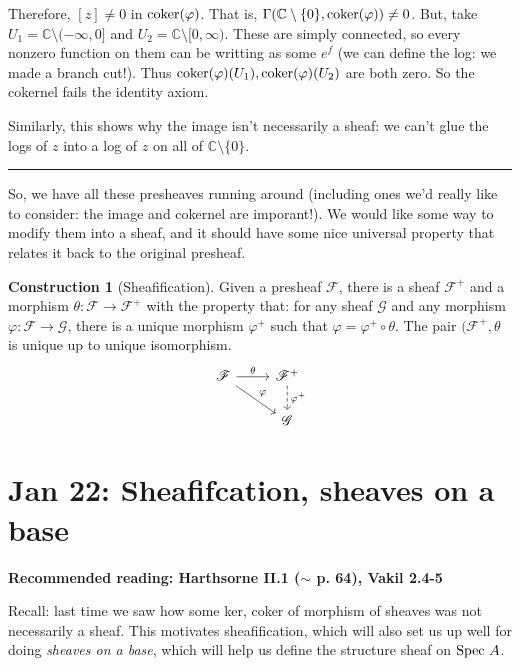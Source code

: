 \documentclass[10pt,reqno]{amsart}
\theoremstyle{definition}
\newtheorem{construction}[theorem]{Construction}
\theoremstyle{remark}
\numberwithin{equation}{section}
\numberwithin{theorem}{section}
\newcommand{\C}{{\mathbb C}}
\newcommand{\spec}{\textup{Spec }}
\newcommand{\coker}{\textup{coker}}
\newcommand{\FF}{{\mathscr F}}
\newcommand{\GG}{{\mathscr G}}
\begin{document}
Therefore, $[z] \ne 0$ in $\textup{coker}(\varphi)$. That is, $\Gamma(\C \setminus \{0\}, \textup{coker}(\varphi)) \ne 0$. But, take $U_1 = \C \setminus (-\infty,0]$ and $U_2 = \C \setminus [0, \infty)$. These are simply connected, so every nonzero function on them can be writting as some $e^f$ (we can define the log: we made a branch cut!). Thus $\coker(\varphi)(U_1), \coker(\varphi)(U_2)$ are both zero. So the cokernel fails the identity axiom.

Similarly, this shows why the image isn't necessarily a sheaf: we can't glue the logs of $z$ into a log of $z$ on all of $\C \setminus\{0\}$.
\\

\hrule
\vspace{1em}

So, we have all these presheaves running around (including ones we'd really like to consider: the image and cokernel are imporant!). We would like some way to modify them into a sheaf, and it should have some nice universal property that relates it back to the original presheaf.

\begin{construction}[Sheafification] Given a presheaf $\FF$, there is a sheaf $\FF^{+}$ and a morphism $\theta: \FF \to \FF^+$ with the property that: for any sheaf $\GG$ and any morphism $\varphi: \FF \to \GG$, there is a unique morphism $\varphi^+$ such that $\varphi = \varphi^+ \circ \theta$. The pair $(\FF^+, \theta$ is unique up to unique isomorphism.
\[\begin{tikzcd}
\FF \arrow[dr, "\varphi"] \arrow[r, "\theta"]& \FF^+ \arrow[d, dashed,"\varphi^+"]\\
& \GG
\end{tikzcd}\]
\end{construction}
\section{Jan 22: Sheafifcation, sheaves on a base}
\textbf{Recommended reading: Harthsorne II.1 ($\sim$ p. 64), Vakil 2.4-5}

Recall: last time we saw how some ker, coker of morphism of sheaves was not necessarily a sheaf. This motivates sheafification, which will also set us up well for doing \textit{sheaves on a base}, which will help us define the structure sheaf on $\spec A$.
\end{document}
